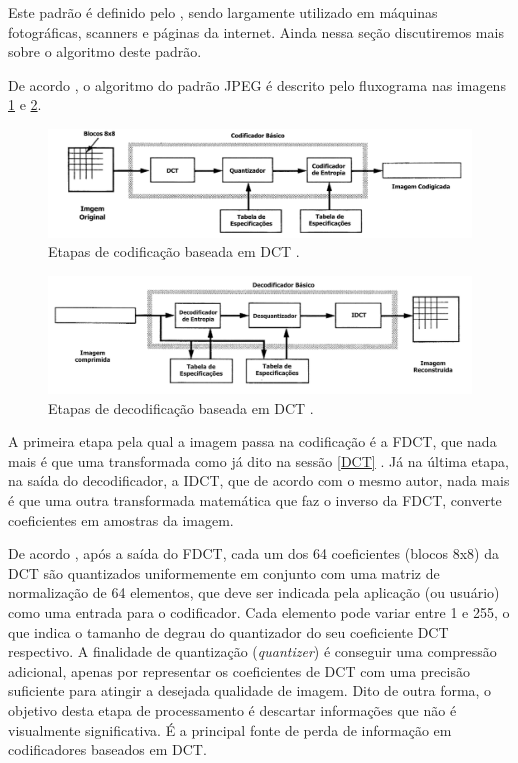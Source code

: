 Este padrão é definido pelo , sendo largamente utilizado em máquinas fotográficas, scanners e páginas da internet. Ainda nessa seção discutiremos mais sobre o algoritmo deste padrão.

De acordo , o algoritmo do padrão JPEG é descrito pelo fluxograma nas imagens \ref{ENCODER_JPEG} e \ref{DECODER_JPEG}.

\begin{figure}[h]
	\centering
	\includegraphics[scale=0.55]{figuras/ENCODER-JPEG.pdf}
	\caption{Etapas de codificação baseada em DCT \cite{wallace1991jpeg}.}
	\label{ENCODER_JPEG}
\end{figure}

\begin{figure}[h]
	\centering
	\includegraphics[scale=0.55]{figuras/DECODER-JPEG.pdf}
	\caption{Etapas de decodificação baseada em DCT \cite{wallace1991jpeg}.}
	\label{DECODER_JPEG}
\end{figure}
  
 A primeira etapa pela qual a imagem passa na codificação é a FDCT, que nada mais é que uma transformada como já dito na sessão \ref{DCT} . Já na última etapa, na saída do decodificador, a IDCT, que de acordo com o mesmo autor, nada mais é que uma outra transformada matemática que faz o inverso da FDCT, converte coeficientes em amostras da imagem. 

De acordo , após a saída do FDCT, cada um dos 64 coeficientes (blocos 8x8) da DCT  são quantizados uniformemente em conjunto com uma matriz de normalização de 64 elementos, que deve ser indicada pela aplicação (ou usuário) como uma entrada para o codificador. Cada elemento pode variar entre 1 e 255, o que indica o tamanho de degrau do quantizador do seu coeficiente DCT respectivo. A finalidade de quantização (\textit{quantizer}) é conseguir uma compressão adicional, apenas por representar os coeficientes de DCT com uma precisão suficiente para atingir a desejada qualidade de imagem. Dito de outra forma, o objetivo desta etapa de processamento é descartar informações que não é visualmente significativa. É a principal fonte de perda de informação em codificadores baseados em DCT.

